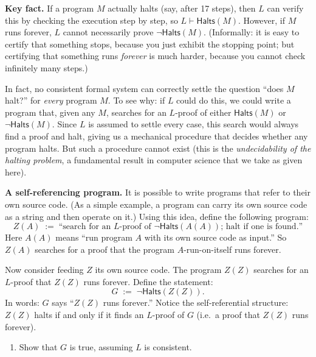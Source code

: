 \documentclass[11pt]{article}
\begin{document}
\begin{exercise}
\label{ex:godel}
\noindent
\textbf{Key fact.} If a program $M$ actually halts (say, after 17 steps), then $L$ can
verify this by checking the execution step by step, so $L \vdash \mathsf{Halts}(M)$.
However, if $M$ runs forever, $L$ cannot necessarily prove
$\neg\mathsf{Halts}(M)$. (Informally: it is easy to certify that something stops, because
you just exhibit the stopping point; but certifying that something runs \emph{forever}
is much harder, because you cannot check infinitely many steps.)

\medskip
\noindent
In fact, no consistent formal system can correctly settle the question ``does $M$ halt?''
for \emph{every} program $M$. To see why: if $L$ could do this, we could write a program
that, given any $M$, searches for an $L$-proof of either $\mathsf{Halts}(M)$ or
$\neg\mathsf{Halts}(M)$. Since $L$ is assumed to settle every case, this search would
always find a proof and halt, giving us a mechanical procedure that decides whether
any program halts. But such a procedure cannot exist (this is the \emph{undecidability
of the halting problem}, a fundamental result in computer science that we take as
given here).

\medskip
\noindent
\textbf{A self-referencing program.} It is possible to write programs that refer to
their own source code. (As a simple example, a program can carry its own source code
as a string and then operate on it.) Using this idea, define the following program:
\[
  Z(A) \;:=\; \text{``search for an $L$-proof of
  $\neg\mathsf{Halts}(A(A))$; halt if one is found.''}
\]
Here $A(A)$ means ``run program $A$ with its own source code as input.'' So $Z(A)$
searches for a proof that the program $A$-run-on-itself runs forever.

\medskip
\noindent
Now consider feeding $Z$ its own source code. The program $Z(Z)$ searches for an
$L$-proof that $Z(Z)$ runs forever. Define the statement:
\[
  G \;:=\; \neg\mathsf{Halts}(Z(Z)).
\]
In words: $G$ says ``$Z(Z)$ runs forever.'' Notice the self-referential
structure: $Z(Z)$ halts if and only if it finds an $L$-proof of $G$ (i.e.\ a proof that
$Z(Z)$ runs forever).

\begin{enumerate}
\item \label{ex:godel-a} Show that $G$ is true, assuming $L$ is consistent.

\begin{hint}


\end{hint}
\end{enumerate}
\end{exercise}
\end{document}
